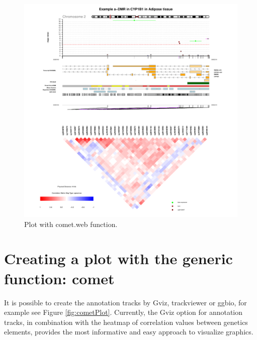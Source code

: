 \documentclass[11pt]{article}\usepackage[]{graphicx}\usepackage[usenames,dvipsnames]{color}
\makeatletter
\def\maxwidth{ %
  \ifdim\Gin@nat@width>\linewidth
    \linewidth
  \else
    \Gin@nat@width
  \fi
}
\newenvironment{knitrout}{}{} %
\makeatother
\begin{document}
\begin{figure}
\begin{knitrout}
\color{fgcolor}

{\centering \includegraphics[width=\maxwidth]{figure/minimal-cometwebPlot} 

}



\end{knitrout}
\caption{Plot with comet.web function.\label{fig:cometweb_simple}}
\end{figure}

\section{Creating a plot with the generic function: comet}
It is possible to create the annotation tracks by Gviz, trackviewer or ggbio, for example see Figure \ref{fig:cometPlot}.
Currently, the Gviz option for annotation tracks, in combination with the heatmap of correlation values between genetics elements, provides the most informative and easy approach to visualize graphics.
\end{document}
